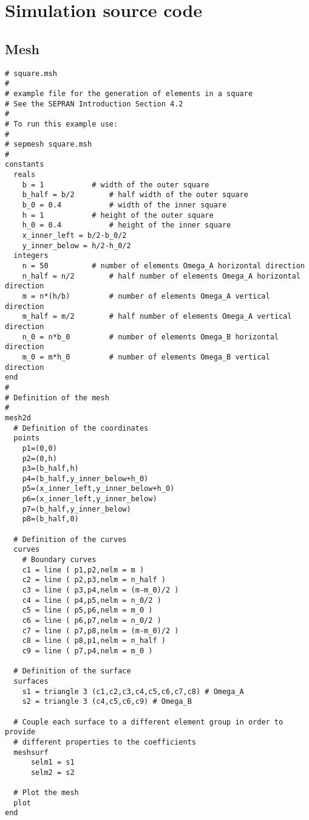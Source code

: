 \section{Simulation source code}
\subsection{Mesh}\label{ap:mesh}
\begin{lstlisting}
# square.msh
#
# example file for the generation of elements in a square
# See the SEPRAN Introduction Section 4.2
#
# To run this example use:
#
# sepmesh square.msh
#
constants
  reals
    b = 1			# width of the outer square
    b_half = b/2		# half width of the outer square
    b_0 = 0.4			# width of the inner square
    h = 1			# height of the outer square
    h_0 = 0.4			# height of the inner square
    x_inner_left = b/2-b_0/2
    y_inner_below = h/2-h_0/2
  integers
    n = 50			# number of elements Omega_A horizontal direction
    n_half = n/2		# half number of elements Omega_A horizontal direction
    m = n*(h/b)			# number of elements Omega_A vertical direction
    m_half = m/2		# half number of elements Omega_A vertical direction
    n_0 = n*b_0			# number of elements Omega_B horizontal direction
    m_0 = m*h_0			# number of elements Omega_B vertical direction
end
#
# Definition of the mesh
#
mesh2d
  # Definition of the coordinates
  points
    p1=(0,0)
    p2=(0,h)
    p3=(b_half,h)
    p4=(b_half,y_inner_below+h_0)
    p5=(x_inner_left,y_inner_below+h_0)
    p6=(x_inner_left,y_inner_below)
    p7=(b_half,y_inner_below)
    p8=(b_half,0)
  
  # Definition of the curves  
  curves
    # Boundary curves
    c1 = line ( p1,p2,nelm = m )
    c2 = line ( p2,p3,nelm = n_half )
    c3 = line ( p3,p4,nelm = (m-m_0)/2 )
    c4 = line ( p4,p5,nelm = n_0/2 ) 
    c5 = line ( p5,p6,nelm = m_0 )
    c6 = line ( p6,p7,nelm = n_0/2 )
    c7 = line ( p7,p8,nelm = (m-m_0)/2 )
    c8 = line ( p8,p1,nelm = n_half )
    c9 = line ( p7,p4,nelm = m_0 )
    
  # Definition of the surface  
  surfaces
    s1 = triangle 3 (c1,c2,c3,c4,c5,c6,c7,c8) # Omega_A
    s2 = triangle 3 (c4,c5,c6,c9) # Omega_B

  # Couple each surface to a different element group in order to provide
  # different properties to the coefficients
  meshsurf
      selm1 = s1
      selm2 = s2

  # Plot the mesh  
  plot
end
\end{lstlisting}

